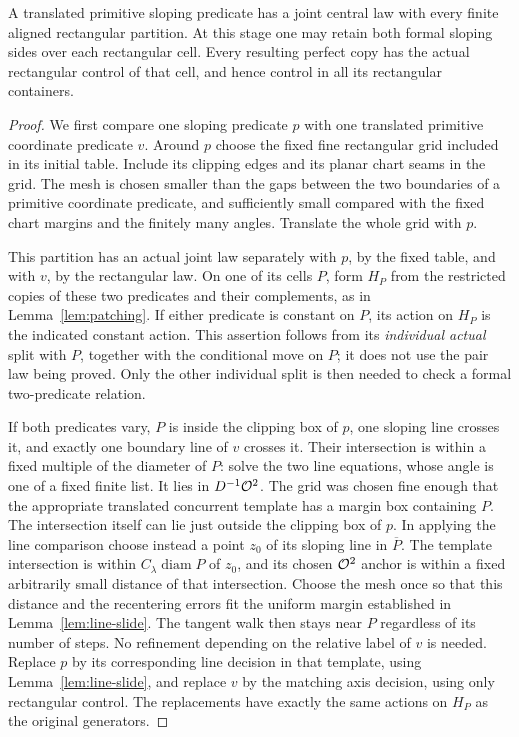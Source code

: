 \begin{lemma}
\label{lem:slope-rectangle}
A translated primitive sloping predicate has a joint central law
with every finite aligned rectangular partition.  At this stage
one may retain both formal sloping sides over each rectangular
cell.  Every resulting perfect copy has the actual rectangular
control of that cell, and hence control in all its rectangular
containers.
\end{lemma}

\begin{proof}
We first compare one sloping predicate $p$ with one translated
primitive coordinate predicate $v$.  Around $p$ choose the fixed
fine rectangular grid included in its initial table.  Include
its clipping edges and its planar chart seams in the grid.
The mesh is chosen smaller than the gaps between the two
boundaries of a primitive coordinate predicate, and sufficiently
small compared with the fixed chart margins and the finitely
many angles.  Translate the whole grid with $p$.

This partition has an actual joint law separately with $p$, by
the fixed table, and with $v$, by the rectangular law.  On one
of its cells $P$, form $H_P$ from the restricted copies of these
two predicates and their complements, as in
Lemma~\ref{lem:patching}.  If either predicate is constant on
$P$, its action on $H_P$ is the indicated constant action.  This
assertion follows from its \emph{individual actual} split with
$P$, together with the conditional move on $P$; it does not use
the pair law being proved.  Only the other individual split is
then needed to check a formal two-predicate relation.

If both predicates vary, $P$ is inside the clipping box of $p$,
one sloping line crosses it, and exactly one boundary line of
$v$ crosses it.  Their intersection is within a fixed multiple
of the diameter of $P$: solve the two line equations, whose
angle is one of a fixed finite list.  It lies in
$D^{-1}\mathcal O^2$.  The grid was chosen fine enough that the
appropriate translated concurrent template has a margin box
containing $P$.  The intersection itself can lie just outside
the clipping box of $p$.  In applying the line comparison choose
instead a point $z_0$ of its sloping line in $\overline P$.
The template intersection is within $C_\lambda\operatorname{diam}P$
of $z_0$, and its chosen $\mathcal O^2$ anchor is within a fixed arbitrarily
small distance of that intersection.  Choose the mesh once so
that this distance and the recentering errors fit the uniform
margin established in Lemma~\ref{lem:line-slide}.  The tangent
walk then stays near $P$ regardless of its number of steps.
No refinement depending on the relative label of $v$ is needed.
Replace $p$ by its corresponding line decision
in that template, using Lemma~\ref{lem:line-slide}, and replace
$v$ by the matching axis decision, using only rectangular
control.  The replacements have exactly the same actions on
$H_P$ as the original generators.


\end{proof}
